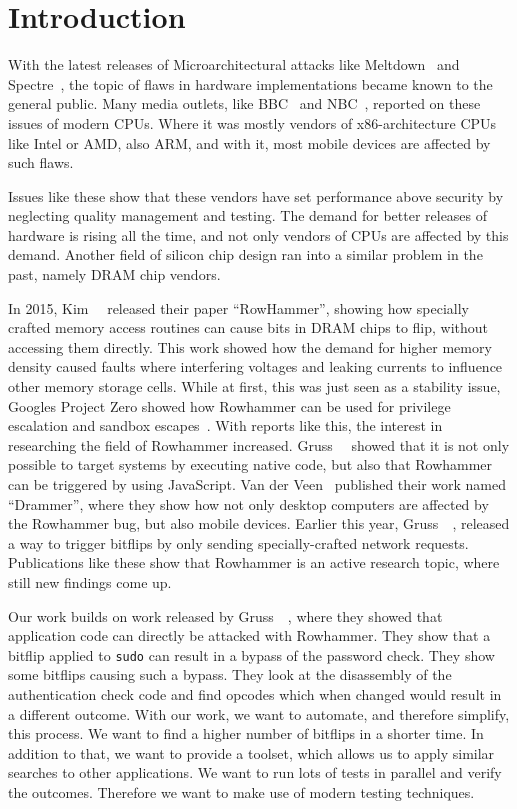 \chapter{Introduction}\label{sec:intro}

With the latest releases of Microarchitectural attacks like
Meltdown~\cite{meltdown} and Spectre~\cite{spectre}, the topic of flaws in
hardware implementations became known to the general public. Many media outlets,
like BBC~\cite{bbcmeltdown} and NBC~\cite{nbcmeltdown}, reported on these issues
of modern CPUs. Where it was mostly vendors of x86-architecture CPUs like Intel
or AMD, also ARM, and with it, most mobile devices are affected by such flaws.

Issues like these show that these vendors have set performance above security by
neglecting quality management and testing. The demand for better releases of
hardware is rising all the time, and not only vendors of CPUs are affected by
this demand. Another field of silicon chip design ran into a similar problem in
the past, namely DRAM chip vendors.  

In 2015, Kim~\etal~\cite{rowhammergeneral} released their paper ``RowHammer'',
showing how specially crafted memory access routines can cause bits in DRAM
chips to flip, without accessing them directly. This work showed how the demand
for higher memory density caused faults where interfering voltages and leaking
currents to influence other memory storage cells. While at first, this was just
seen as a stability issue, Google\textquotesingle s Project Zero showed how
Rowhammer can be used for privilege escalation and sandbox
escapes~\cite{projectzerorow}. With reports like this, the interest in
researching the field of Rowhammer increased. Gruss~\etal~\cite{rowhammerjs}
showed that it is not only possible to target systems by executing native code,
but also that Rowhammer can be triggered by using JavaScript. Van der
Veen~\etal\cite{drammer} published their work named ``Drammer'', where they show
how not only desktop computers are affected by the Rowhammer bug, but also
mobile devices. Earlier this year, Gruss~\etal~\cite{nethammer}, released a way
to trigger bitflips by only sending specially-crafted network requests.
Publications like these show that Rowhammer is an active research topic, where
still new findings come up.

Our work builds on work released by Gruss~\etal~\cite{flipinthewall}, where they
showed that application code can directly be attacked with Rowhammer. They show
that a bitflip applied to \texttt{sudo} can result in a bypass of the password
check. They show some bitflips causing such a bypass. They look at the
disassembly of the authentication check code and find opcodes which when changed
would result in a different outcome. With our work, we want to automate, and
therefore simplify, this process. We want to find a higher number of bitflips in
a shorter time. In addition to that, we want to provide a toolset, which allows
us to apply similar searches to other applications. We want to run lots of tests
in parallel and verify the outcomes. Therefore we want to make use of modern
testing techniques.

